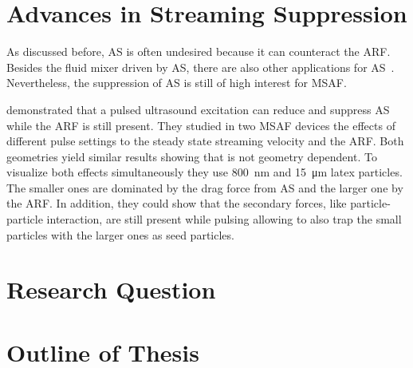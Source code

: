 \section{Advances in Streaming Suppression}

As discussed before, AS is often undesired because it can counteract the ARF.  
Besides the fluid mixer driven by AS, there are also other applications for 
AS~\cite{Wiklund2012a}. Nevertheless, the suppression of AS is still of high 
interest for MSAF.

 demonstrated that a pulsed ultrasound excitation can reduce 
and suppress AS while the ARF is still present. They studied in two MSAF 
devices the effects of different pulse settings to the steady state streaming 
velocity and the ARF. Both geometries yield similar results showing that is not 
geometry dependent. To visualize both effects simultaneously they use 
\SI{800}{\nm} and \SI{15}{\um} latex particles. The smaller ones are dominated 
by the drag force from AS and the larger one by the ARF. In addition, they 
could show that the secondary forces, like particle-particle interaction, are 
still present while pulsing allowing to also trap the small particles with the 
larger ones as seed particles.


\section{Research Question\label{sec:I-researchquestion}}

\section{Outline of Thesis\label{sec:I-outline}}
